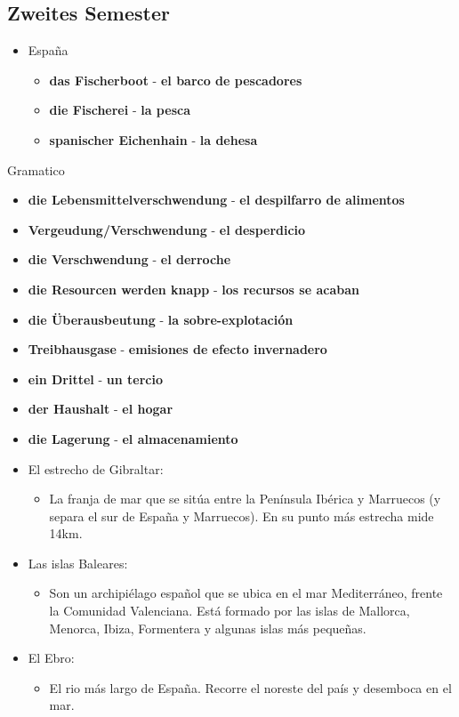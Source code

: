 \documentclass{article}
\begin{document}
	\subsection{Zweites Semester}
	\begin{multicols}
	\begin{itemize}
		\item{España}
		\begin{itemize}
			\item{\textbf{das Fischerboot} - \textbf{el barco de pescadores}}
			\item{\textbf{die Fischerei} - \textbf{la pesca}}
			\item{\textbf{spanischer Eichenhain} - \textbf{la dehesa}}
		\end{itemize}
	\end{itemize}
		\item{Gramatico}
		\begin{itemize}
			\item{\textbf{die Lebensmittelverschwendung} - \textbf{el despilfarro de alimentos}}
			\item{\textbf{Vergeudung/Verschwendung} - \textbf{el desperdicio}}
			\item{\textbf{die Verschwendung} - \textbf{el derroche}}
			\item{\textbf{die Resourcen werden knapp} - \textbf{los recursos se acaban}}
			\item{\textbf{die Überausbeutung} - \textbf{la sobre-explotación}}
			\item{\textbf{Treibhausgase} - \textbf{emisiones de efecto invernadero}}
			\item{\textbf{ein Drittel} - \textbf{un tercio}}
			\item{\textbf{der Haushalt} - \textbf{el hogar}}
			\item{\textbf{die Lagerung} - \textbf{el almacenamiento}}
		\end{itemize}
	\end{multicols}
	\begin{itemize}
		\item{El estrecho de Gibraltar:}
		\begin{itemize}
			\item{La franja de mar que se sitúa entre la Península Ibérica y Marruecos (y separa el sur de España y Marruecos). En su punto más estrecha mide 14km.}
		\end{itemize}
		\item{Las islas Baleares:}
		\begin{itemize}
			\item{Son un archipiélago español que se ubica en el mar Mediterráneo, frente la Comunidad Valenciana. Está formado por las islas de Mallorca, Menorca, Ibiza, Formentera y algunas islas más pequeñas.}
		\end{itemize}
		\item{El Ebro:}
		\begin{itemize}
			\item{El rio más largo de España. Recorre el noreste del país y desemboca en el mar.}
		\end{itemize}
	\end{itemize}
\end{document}
